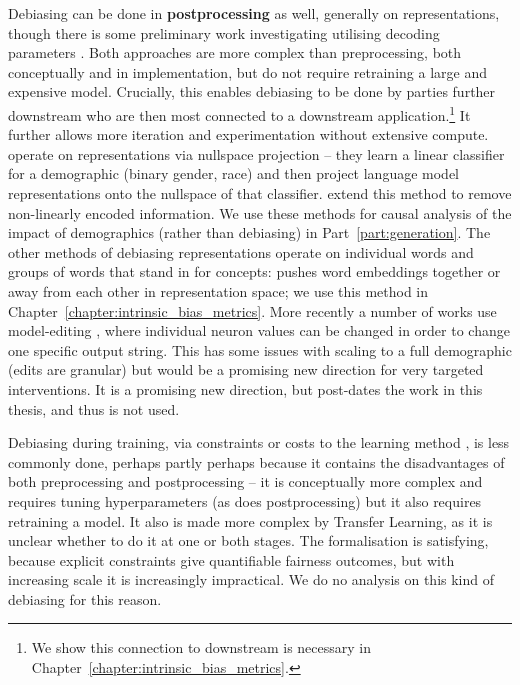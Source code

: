 Debiasing can be done in \textbf{postprocessing} as well, generally on representations, though there is some preliminary work investigating utilising decoding parameters \citep{sheng-etal-2021-societal}. Both approaches are more complex than preprocessing, both conceptually and in implementation,  but do not require retraining a large and expensive model. Crucially, this enables debiasing to be done by parties further downstream who are then most connected to a downstream application.\footnote{We show this connection to downstream is necessary in Chapter~\ref{chapter:intrinsic_bias_metrics}.} It further allows more iteration and experimentation without extensive compute. \citet{ravfogel-etal-2020-null} operate on representations via nullspace projection -- they learn a linear classifier for a demographic (binary gender, race) and then project language model representations onto the nullspace of that classifier. \citet{iskander-etal-2023-shielded} extend this method to remove non-linearly encoded information. We use these methods for causal analysis of the impact of demographics (rather than debiasing) in Part~\ref{part:generation}. The other methods of debiasing representations operate on individual words and groups of words that stand in for concepts: \citet{mrksic-etal-2017-semantic} pushes word embeddings together or away from each other in representation space; we use this method in Chapter~\ref{chapter:intrinsic_bias_metrics}. More recently a number of works use  model-editing \citep{meng2022locating}, where individual neuron values can be changed in order to change one specific output string. This has some issues with scaling to a full demographic (edits are granular) but would be a promising new direction for very targeted interventions. It is a promising new direction, but post-dates the work in this thesis, and thus is not used. 

Debiasing during training, via constraints or costs to the learning method \citep{zhao-etal-2017-men}, is less commonly done, perhaps partly perhaps because it contains the disadvantages of both preprocessing and postprocessing -- it is conceptually more complex and requires tuning hyperparameters (as does postprocessing) but it also requires retraining a model. It also is made more complex by Transfer Learning, as it is unclear whether to do it at one or both stages. The formalisation is satisfying, because explicit constraints give quantifiable fairness outcomes, but with increasing scale it is increasingly impractical. We do no analysis on this kind of debiasing for this reason.

